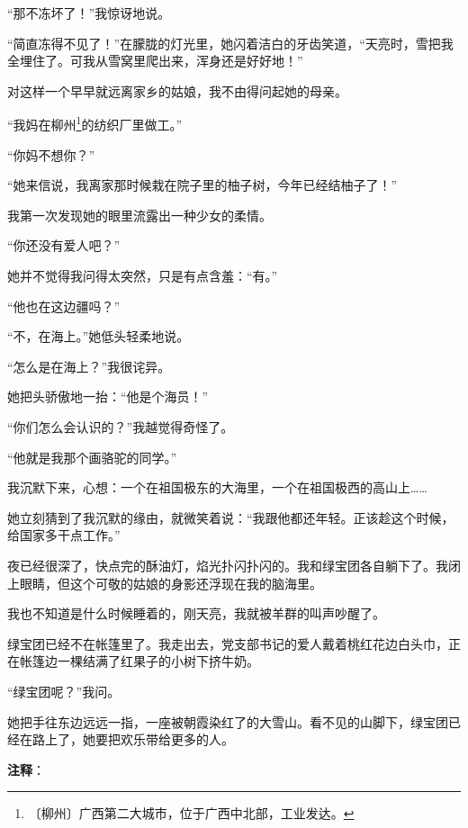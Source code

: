 \documentclass[12pt,UTF-8,openany]{ctexbook}
\begin{document}
\begin{Large}
    “那不冻坏了！”我惊讶地说。
    
    “简直冻得不见了！”在朦胧的灯光里，她闪着洁白的牙齿笑道，“天亮时，雪把我全埋住了。可我从雪窝里爬出来，浑身还是好好地！”
    
    对这样一个早早就远离家乡的姑娘，我不由得问起她的母亲。
    
    “我妈在柳州\footnote{〔柳州〕广西第二大城市，位于广西中北部，工业发达。}的纺织厂里做工。”
    
    “你妈不想你？”
    
    “她来信说，我离家那时候栽在院子里的柚子树，今年已经结柚子了！”
    
    我第一次发现她的眼里流露出一种少女的柔情。
    
    “你还没有爱人吧？”
    
    她并不觉得我问得太突然，只是有点含羞：“有。”
    
    “他也在这边疆吗？”
    
    “不，在海上。”她低头轻柔地说。
    
    “怎么是在海上？”我很诧异。
    
    她把头骄傲地一抬：“他是个海员！”
    
    “你们怎么会认识的？”我越觉得奇怪了。
    
    “他就是我那个画骆驼的同学。”
    
    我沉默下来，心想：一个在祖国极东的大海里，一个在祖国极西的高山上……
    
    她立刻猜到了我沉默的缘由，就微笑着说：“我跟他都还年轻。正该趁这个时候，给国家多干点工作。”
    
    夜已经很深了，快点完的酥油灯，焰光扑闪扑闪的。我和绿宝团各自躺下了。我闭上眼睛，但这个可敬的姑娘的身影还浮现在我的脑海里。
    
    我也不知道是什么时候睡着的，刚天亮，我就被羊群的叫声吵醒了。
    
    绿宝团已经不在帐篷里了。我走出去，党支部书记的爱人戴着桃红花边白头巾，正在帐篷边一棵结满了红果子的小树下挤牛奶。
    
    “绿宝团呢？”我问。
    
    她把手往东边远远一指，一座被朝霞染红了的大雪山。看不见的山脚下，绿宝团已经在路上了，她要把欢乐带给更多的人。
    
\end{Large}


\newpage

\textbf{注释}：

\vspace{-1em}
\end{document}
